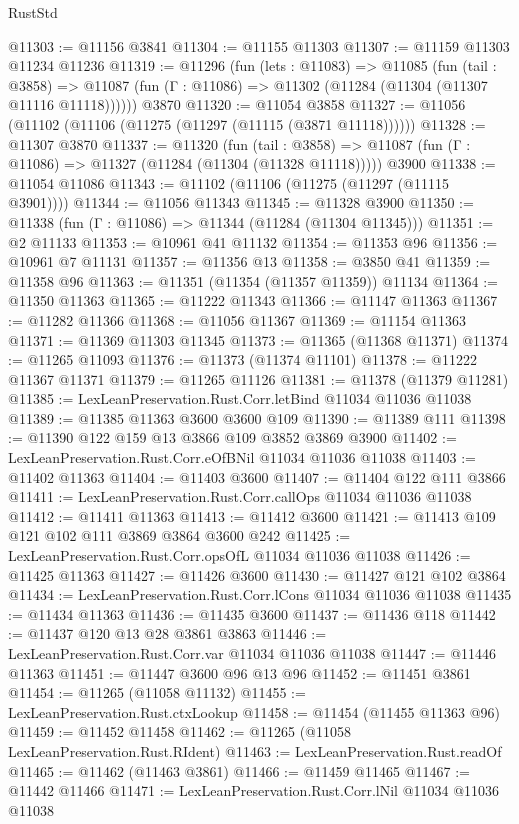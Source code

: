 \begin{lexlean}{RustStd}
\begin{coremodule}
@11303 := @11156 @3841
@11304 := @11155 @11303
@11307 := @11159 @11303 @11234 @11236
@11319 := @11296
    (fun (lets : @11083) =>
    @11085
      (fun (tail : @3858) =>
      @11087 (fun (Γ : @11086) => @11302 (@11284 (@11304 (@11307 @11116 @11118))))))
    @3870
@11320 := @11054 @3858
@11327 := @11056 (@11102 (@11106 (@11275 (@11297 (@11115 (@3871 @11118))))))
@11328 := @11307 @3870
@11337 := @11320
    (fun (tail : @3858) => @11087 (fun (Γ : @11086) => @11327 (@11284 (@11304 (@11328 @11118)))))
    @3900
@11338 := @11054 @11086
@11343 := @11102 (@11106 (@11275 (@11297 (@11115 @3901))))
@11344 := @11056 @11343
@11345 := @11328 @3900
@11350 := @11338 (fun (Γ : @11086) => @11344 (@11284 (@11304 @11345)))
@11351 := @2 @11133
@11353 := @10961 @41 @11132
@11354 := @11353 @96
@11356 := @10961 @7 @11131
@11357 := @11356 @13
@11358 := @3850 @41
@11359 := @11358 @96
@11363 := @11351 (@11354 (@11357 @11359)) @11134
@11364 := @11350 @11363
@11365 := @11222 @11343
@11366 := @11147 @11363
@11367 := @11282 @11366
@11368 := @11056 @11367
@11369 := @11154 @11363
@11371 := @11369 @11303 @11345
@11373 := @11365 (@11368 @11371)
@11374 := @11265 @11093
@11376 := @11373 (@11374 @11101)
@11378 := @11222 @11367 @11371
@11379 := @11265 @11126
@11381 := @11378 (@11379 @11281)
@11385 := LexLeanPreservation.Rust.Corr.letBind @11034 @11036 @11038
@11389 := @11385 @11363 @3600 @3600 @109
@11390 := @11389 @111
@11398 := @11390 @122 @159 @13 @3866 @109 @3852 @3869 @3900
@11402 := LexLeanPreservation.Rust.Corr.eOfBNil @11034 @11036 @11038
@11403 := @11402 @11363
@11404 := @11403 @3600
@11407 := @11404 @122 @111 @3866
@11411 := LexLeanPreservation.Rust.Corr.callOps @11034 @11036 @11038
@11412 := @11411 @11363
@11413 := @11412 @3600
@11421 := @11413 @109 @121 @102 @111 @3869 @3864 @3600 @242
@11425 := LexLeanPreservation.Rust.Corr.opsOfL @11034 @11036 @11038
@11426 := @11425 @11363
@11427 := @11426 @3600
@11430 := @11427 @121 @102 @3864
@11434 := LexLeanPreservation.Rust.Corr.lCons @11034 @11036 @11038
@11435 := @11434 @11363
@11436 := @11435 @3600
@11437 := @11436 @118
@11442 := @11437 @120 @13 @28 @3861 @3863
@11446 := LexLeanPreservation.Rust.Corr.var @11034 @11036 @11038
@11447 := @11446 @11363
@11451 := @11447 @3600 @96 @13 @96
@11452 := @11451 @3861
@11454 := @11265 (@11058 @11132)
@11455 := LexLeanPreservation.Rust.ctxLookup
@11458 := @11454 (@11455 @11363 @96)
@11459 := @11452 @11458
@11462 := @11265 (@11058 LexLeanPreservation.Rust.RIdent)
@11463 := LexLeanPreservation.Rust.readOf
@11465 := @11462 (@11463 @3861)
@11466 := @11459 @11465
@11467 := @11442 @11466
@11471 := LexLeanPreservation.Rust.Corr.lNil @11034 @11036 @11038

\end{coremodule}
\end{lexlean}
